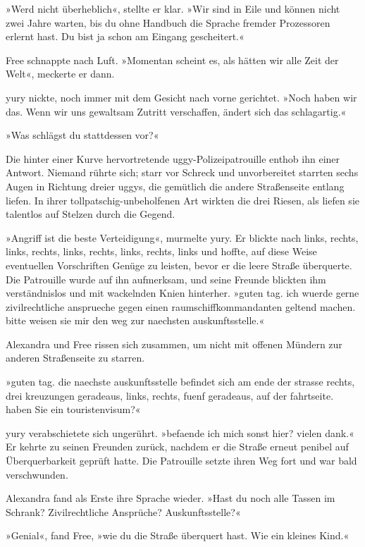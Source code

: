 »Werd nicht überheblich«, stellte er klar. »Wir sind in Eile und können nicht zwei Jahre warten, bis du ohne Handbuch die Sprache fremder Prozessoren erlernt hast. Du bist ja schon am Eingang gescheitert.«

Free schnappte nach Luft. »Momentan scheint es, als hätten wir alle Zeit der Welt«, meckerte er dann.

yury nickte, noch immer mit dem Gesicht nach vorne gerichtet. »Noch haben wir das. Wenn wir uns gewaltsam Zutritt verschaffen, ändert sich das schlagartig.«

»Was schlägst du stattdessen vor?«

Die hinter einer Kurve hervortretende uggy-Polizeipatrouille enthob ihn einer Antwort. Niemand rührte sich; starr vor Schreck und unvorbereitet starrten sechs Augen in Richtung dreier uggys, die gemütlich die andere Straßenseite entlang liefen. In ihrer tollpatschig-unbeholfenen Art wirkten die drei Riesen, als liefen sie talentlos auf Stelzen durch die Gegend.

»Angriff ist die beste Verteidigung«, murmelte yury. Er blickte nach links, rechts, links, rechts, links, rechts, links, rechts, links und hoffte, auf diese Weise eventuellen Vorschriften Genüge zu leisten, bevor er die leere Straße überquerte. Die Patrouille wurde auf ihn aufmerksam, und seine Freunde blickten ihm verständnislos und mit wackelnden Knien hinterher. »guten tag. ich wuerde gerne zivilrechtliche ansprueche gegen einen raumschiffkommandanten geltend machen. bitte weisen sie mir den weg zur naechsten auskunftsstelle.«

Alexandra und Free rissen sich zusammen, um nicht mit offenen Mündern zur anderen Straßenseite zu starren.

»guten tag. die naechste auskunftsstelle befindet sich am ende der strasse rechts, drei kreuzungen geradeaus, links, rechts, fuenf geradeaus, auf der fahrtseite. haben Sie ein touristenvisum?«

yury verabschietete sich ungerührt. »befaende ich mich sonst hier? vielen dank.« Er kehrte zu seinen Freunden zurück, nachdem er die Straße erneut penibel auf Überquerbarkeit geprüft hatte. Die Patrouille setzte ihren Weg fort und war bald verschwunden.

Alexandra fand als Erste ihre Sprache wieder. »Hast du noch alle Tassen im Schrank? Zivilrechtliche Ansprüche? Auskunftsstelle?«

»Genial«, fand Free, »wie du die Straße überquert hast. Wie ein kleines Kind.«

